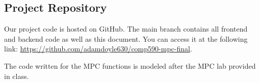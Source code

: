 \documentclass[conference]{IEEEtran}
\begin{document}
\subsection*{Project Repository}

Our project code is hosted on GitHub. The main branch contains all frontend and backend code as well as this document. You can access it at the following link:
\url{https://github.com/adamdoyle630/comp590-mpc-final}.

\begin{thebibliography}{9}

The code written for the MPC functions is modeled after the MPC lab provided in class.

\end{thebibliography}
\end{document}

